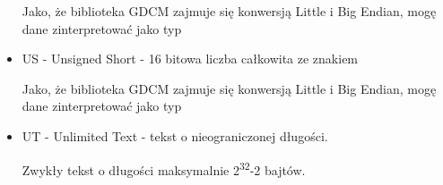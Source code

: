 \begin{itemize}
    Jako, że biblioteka GDCM zajmuje się konwersją Little i Big Endian, mogę dane zinterpretować jako typ 

    \item US - Unsigned Short - 16 bitowa liczba całkowita ze znakiem

    Jako, że biblioteka GDCM zajmuje się konwersją Little i Big Endian, mogę dane zinterpretować jako typ 
    
    \item UT - Unlimited Text - tekst o nieograniczonej długości.

    Zwykły tekst o długości maksymalnie 2\textsuperscript{32}-2 bajtów.
\end{itemize}